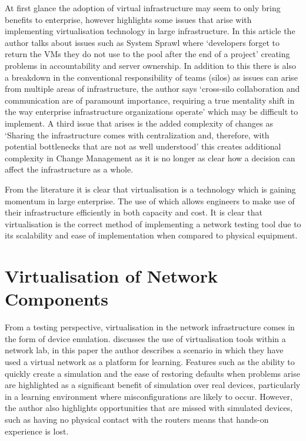 \documentclass[11pt]{report}
\begin{document}
At first glance the adoption of virtual infrastructure may seem to only bring benefits to enterprise, however \citep{kotsovinos2010virtualization} highlights some issues that arise with implementing virtualisation technology in large infrastructure. In this article the author talks about issues such as System Sprawl where `developers forget to return the VMs they do not use to the pool after the end of a project' creating problems in accountability and server ownership. In addition to this there is also a breakdown in the conventional responsibility of teams (silos) as issues can arise from multiple areas of infrastructure, the author says `cross-silo collaboration and communication are of paramount importance, requiring a true mentality shift in the way enterprise infrastructure organizations operate' which may be difficult to implement. A third issue that arises is the added complexity of changes as `Sharing the infrastructure comes with centralization and, therefore, with potential bottlenecks that are not as well understood' this creates additional complexity in Change Management as it is no longer as clear how a decision can affect the infrastructure as a whole.

From the literature it is clear that virtualisation is a technology which is gaining momentum in large enterprise. The use of which allows engineers to make use of their infrastructure efficiently in both capacity and cost. It is clear that virtualisation is the correct method of implementing a network testing tool due to its scalability and ease of implementation when compared to physical equipment. 

\section{Virtualisation of Network Components}

From a testing perspective, virtualisation in the network infrastructure comes in the form of device emulation. \citep{galan2004use} discusses the use of virtualisation tools within a network lab, 
in this paper the author describes a scenario in which they have used a virtual network as a platform for learning. Features such as the ability to quickly create a simulation and the ease of restoring defaults when problems arise are highlighted as a significant benefit of simulation over real devices, particularly in a learning environment where misconfigurations are likely to occur. However, the author also highlights opportunities that are missed with simulated devices, such as having no physical contact with the routers means that hands-on experience is lost.
\end{document}
